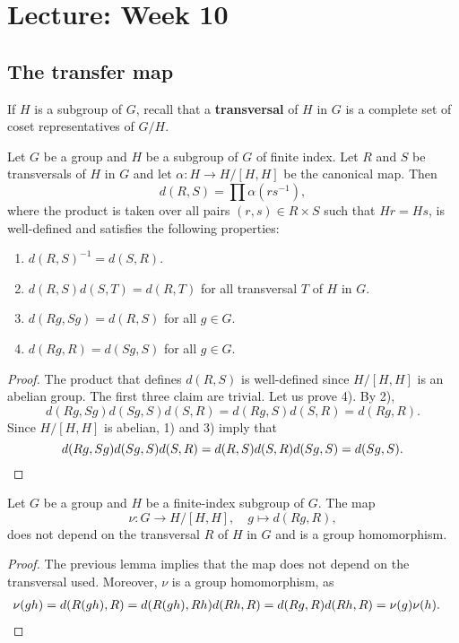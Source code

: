 \section{Lecture: Week 10}



\subsection{The transfer map}

If $H$ is a subgroup of $G$, recall that 
a \textbf{transversal} of $H$ in $G$ is a complete
set of coset representatives of $G/H$. 

\begin{lemma}
	\label{lem:d:transfer}
	Let $G$ be a group and $H$ be a subgroup of $G$ of finite index.  Let $R$
	and $S$ be transversals of $H$ in $G$ and let $\alpha\colon H\to H/[H,H]$
	be the canonical map. Then 
	\[
		d(R,S)=\prod \alpha(rs^{-1}),
	\]
	where the product is taken over all pairs 
	$(r,s)\in R\times S$ such that $Hr=Hs$,
	is well-defined and satisfies the following properties:
	\begin{enumerate}
		\item $d(R,S)^{-1}=d(S,R)$.
		\item $d(R,S)d(S,T)=d(R,T)$ for all transversal $T$ of $H$ in $G$.
		\item $d(Rg,Sg)=d(R,S)$ for all $g\in G$.
		\item $d(Rg,R)=d(Sg,S)$ for all $g\in G$.
	\end{enumerate}
\end{lemma}

\begin{proof}
	The product that defines $d(R,S)$ is well-defined since $H/[H,H]$ is 
	an abelian group. The first three claim are trivial. Let us prove
	4). By 2), 
	\[
		d(Rg,Sg)d(Sg,S)d(S,R)=d(Rg,S)d(S,R)=d(Rg,R).
	\]
	Since $H/[H,H]$ is abelian, 1) and 3) imply that 	
	\[
		d(Rg,Sg)d(Sg,S)d(S,R)=d(R,S)d(S,R)d(Sg,S)=d(Sg,S).\qedhere
	\]
\end{proof}

\begin{theorem}
	\label{thm:transfer}
	Let $G$ be a group and $H$ be a finite-index subgroup of $G$. The map 	
	\[
		\nu\colon G\to H/[H,H],\quad
		g\mapsto d(Rg,R),
	\]
	does not depend on the transversal $R$ of $H$ in $G$ and is a group
	homomorphism. 
\end{theorem}

\begin{proof}
	The previous lemma implies that the map does not depend on the transversal used. 
	Moreover, $\nu$ is a group homomorphism, as 
	\begin{align*}
		\nu(gh)&=d(R(gh),R)
		=d(R(gh),Rh)d(Rh,R)
		=d(Rg,R)d(Rh,R)=\nu(g)\nu(h).\qedhere
	\end{align*}
\end{proof}

